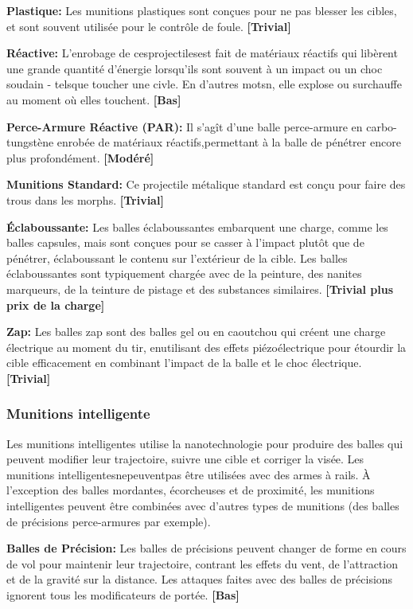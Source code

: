 \textbf{Plastique:} Les munitions plastiques sont conçues pour ne pas blesser les cibles, et sont souvent utilisée pour le contrôle de foule. \textbf{[Trivial]} 

\textbf{Réactive:} L'enrobage de cesprojectilesest fait de matériaux réactifs qui libèrent une grande quantité d'énergie lorsqu'ils sont souvent à un impact ou un choc soudain - telsque toucher une civle. En d'autres motsn, elle explose ou surchauffe au moment où elles touchent. \textbf{[Bas]} 

\textbf{Perce-Armure Réactive (PAR):} Il s'agît d'une balle perce-armure en carbo-tungstène enrobée de matériaux réactifs,permettant à la balle de pénétrer encore plus profondément. \textbf{[Modéré]} 

\textbf{Munitions Standard:} Ce projectile métalique standard est conçu pour faire des trous dans les morphs. \textbf{[Trivial]} 

\textbf{Éclaboussante:} Les balles éclaboussantes embarquent une charge, comme les balles capsules, mais sont conçues pour se casser à l'impact plutôt que de pénétrer, éclaboussant le contenu sur l'extérieur de la cible. Les balles éclaboussantes sont typiquement chargée avec de la peinture, des nanites marqueurs, de la teinture de pistage et des substances similaires. \textbf{[Trivial plus prix de la charge]} 

\textbf{Zap:} Les balles zap sont des balles gel ou en caoutchou qui créent une charge électrique au moment du tir, enutilisant des effets piézoélectrique pour étourdir la cible efficacement en combinant l'impact de la balle et le choc électrique. \textbf{[Trivial]} 

\subsubsection{Munitions intelligente} 

Les munitions intelligentes utilise la nanotechnologie pour produire des balles qui peuvent modifier leur trajectoire, suivre une cible et corriger la visée. Les munitions intelligentesnepeuventpas être utilisées avec des armes à rails. À l'exception des balles mordantes, écorcheuses et de proximité, les munitions intelligentes peuvent être combinées avec d'autres types de munitions (des balles de précisions perce-armures par exemple). 

\textbf{Balles de Précision:} Les balles de précisions peuvent changer de forme en cours de vol pour maintenir leur trajectoire, contrant les effets du vent, de l'attraction et de la gravité sur la distance. Les attaques faites avec des balles de précisions ignorent tous les modificateurs de portée. \textbf{[Bas]} 

